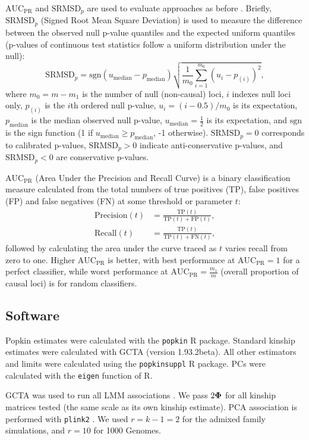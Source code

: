 \documentclass[11pt]{article}
\newcommand{\rmsd}{\text{SRMSD}_p}
\newcommand{\auc}{\text{AUC}_\text{PR}}
\newcommand{\kinMat}{%
  \ensuremath{%
    \mathbf{\Phi}
  }%
  \xspace%
}%
\begin{document}
$\auc$ and $\rmsd$ are used to evaluate approaches as before \citep{yao_limitations_2022}.
Briefly, $\rmsd$ (Signed Root Mean Square Deviation) is used to measure the difference between the observed null p-value quantiles and the expected uniform quantiles (p-values of continuous test statistics follow a uniform distribution under the null):
$$
\rmsd
=
\text{sgn}(u_\text{median} - p_\text{median} ) \sqrt{ \frac{1}{m_0} \sum_{i = 1}^{m_0} \left( u_i - p_{(i)} \right)^2 },
$$
where
$m_0 = m - m_1$ is the number of null (non-causal) loci,
$i$ indexes null loci only,
$p_{(i)}$ is the $i$th ordered null p-value,
$u_i = ( i - 0.5 ) / m_0$ is its expectation,
$p_\text{median}$ is the median observed null p-value,
$u_\text{median} = \frac{1}{2}$ is its expectation,
and $\text{sgn}$ is the sign function (1 if $u_\text{median} \ge p_\text{median}$, -1 otherwise).
$\rmsd = 0$ corresponds to calibrated p-values, $\rmsd > 0$ indicate anti-conservative p-values, and $\rmsd < 0$ are conservative p-values.

$\auc$ (Area Under the Precision and Recall Curve) is a binary classification measure calculated from the total numbers of true positives (TP), false positives (FP) and false negatives (FN) at some threshold or parameter $t$:
\begin{align*}
  \text{Precision}(t)
  &=
    \frac{ \text{TP}(t) }{ \text{TP}(t) + \text{FP}(t) }
    , \\
  \text{Recall}(t)
  &=
    \frac{ \text{TP}(t) }{ \text{TP}(t) + \text{FN}(t) }
    ,
\end{align*}
followed by calculating the area under the curve traced as $t$ varies recall from zero to one.
Higher $\auc$ is better, with best performance at $\auc = 1$ for a perfect classifier, while worst performance at $\auc = \frac{m_1}{m}$ (overall proportion of causal loci) is for random classifiers.



\subsection{Software}

Popkin estimates were calculated with the \texttt{popkin} R package.
Standard kinship estimates were calculated with GCTA (version 1.93.2beta).
All other estimators and limits were calculated using the \texttt{popkinsuppl} R package.
PCs were calculated with the \texttt{eigen} function of R.

GCTA was used to run all LMM associations \citep{yang_gcta:_2011, yang_advantages_2014}. We pass $2 \kinMat$ for all kinship matrices tested (the same scale as its own kinship estimate).
PCA association is performed with \texttt{plink2} \citep{chang_second-generation_2015}.
We used $r=k-1=2$ for the admixed family simulations, and $r=10$ for 1000 Genomes.
\end{document}
